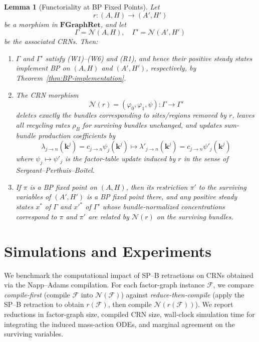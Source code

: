 \documentclass{article}
\theoremstyle{plain}
\newtheorem{lemma}[theorem]{Lemma}
\theoremstyle{definition}
\theoremstyle{remark}
\newcommand{\<}{\langle}
\renewcommand{\>}{\rangle}
\begin{document}
\begin{lemma}[Functoriality at BP Fixed Points]\label{thm:functor-BP}
Let
\[
r : (A, H) \longrightarrow (A', H')
\]
be a morphism in $\mathbf{FGraphRet}$, and let
\[
\Gamma = \mathcal{N}(A, H), \quad \Gamma' = \mathcal{N}(A', H')
\]
be the associated CRNs. Then:
\begin{enumerate}
\item $\Gamma$ and $\Gamma'$ satisfy \emph{(W1)--(W6)} and \emph{(R1)}, and hence their 
positive steady states implement BP on $(A, H)$ and $(A', H')$, respectively, by 
Theorem~\ref{thm:BP-implementation}.

\item The CRN morphism
\[
\mathcal{N}(r) = (\varphi_0, \varphi_1, \psi) : \Gamma \to \Gamma'
\]
deletes exactly the bundles corresponding to sites/regions removed by $r$, leaves all 
recycling rates $\rho_B$ for surviving bundles unchanged, and updates sum-bundle 
production coefficients by
\[
\lambda_{j \to n}(\mathbf{k}^j) = c_{j \to n} \psi_j(\mathbf{k}^j) 
\longmapsto \lambda'_{j \to n}(\mathbf{k}^j) = c_{j \to n} \psi'_j(\mathbf{k}^j)
\]
where $\psi_j \mapsto \psi'_j$ is the factor-table update induced by $r$ in the sense 
of Sergeant--Perthuis--Boitel.
\item If $\pi$ is a BP fixed point on $(A, H)$, then its restriction $\pi'$ to the 
surviving variables of $(A', H')$ is a BP fixed point there, and any positive steady 
states $x^*$ of $\Gamma$ and $x'^*$ of $\Gamma'$ whose bundle-normalized concentrations 
correspond to $\pi$ and $\pi'$ are related by $\mathcal{N}(r)$ on the surviving bundles.
\end{enumerate}
\end{lemma}

\section{Simulations and Experiments}
\label{sec:simulations}

We benchmark the computational impact of SP--B retractions on CRNs
obtained via the Napp--Adams compilation. For each factor-graph
instance $\mathcal{F}$, we compare \emph{compile-first} (compile
$\mathcal{F}$ into $\mathcal{N}(\mathcal{F})$) against
\emph{reduce-then-compile} (apply the SP--B retraction to obtain
$r(\mathcal{F})$, then compile $\mathcal{N}(r(\mathcal{F}))$).
We report reductions in factor-graph size, compiled CRN size,
wall-clock simulation time for integrating the induced mass-action ODEs,
and marginal agreement on the surviving variables.
\end{document}
